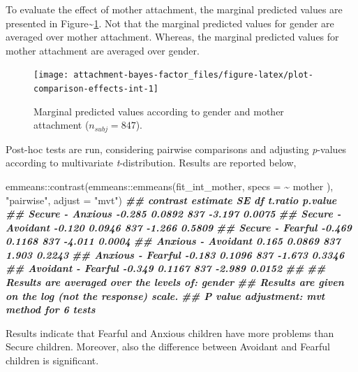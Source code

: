 \documentclass[
]{book}
\newenvironment{Shaded}{\begin{snugshade}}{\end{snugshade}}
\newcommand{\AttributeTok}[1]{\textcolor[rgb]{0.77,0.63,0.00}{#1}}
\newcommand{\DocumentationTok}[1]{\textcolor[rgb]{0.56,0.35,0.01}{\textbf{\textit{#1}}}}
\newcommand{\FunctionTok}[1]{\textcolor[rgb]{0.00,0.00,0.00}{#1}}
\newcommand{\NormalTok}[1]{#1}
\newcommand{\SpecialCharTok}[1]{\textcolor[rgb]{0.00,0.00,0.00}{#1}}
\newcommand{\StringTok}[1]{\textcolor[rgb]{0.31,0.60,0.02}{#1}}
\begin{document}
To evaluate the effect of mother attachment, the marginal predicted values are presented in Figure\textasciitilde\ref{fig:plot-comparison-effects-int}. Not that the marginal predicted values for gender are averaged over mother attachment. Whereas, the marginal predicted values for mother attachment are averaged over gender.

\begin{figure}

{\centering \texttt{[image: attachment-bayes-factor\_files/figure-latex/plot-comparison-effects-int-1]} 

}

\caption{Marginal predicted values according to gender and mother attachment ($n_{subj} = 847$).}\label{fig:plot-comparison-effects-int}
\end{figure}

Post-hoc tests are run, considering pairwise comparisons and adjusting \emph{p}-values according to multivariate \emph{t}-distribution. Results are reported below,

\begin{Shaded}
\begin{Highlighting}[]
\NormalTok{emmeans}\SpecialCharTok{::}\FunctionTok{contrast}\NormalTok{(emmeans}\SpecialCharTok{::}\FunctionTok{emmeans}\NormalTok{(fit\_int\_mother, }\AttributeTok{specs =} \SpecialCharTok{\textasciitilde{}}\NormalTok{ mother ),}
                  \StringTok{"pairwise"}\NormalTok{, }\AttributeTok{adjust =} \StringTok{"mvt"}\NormalTok{)}
\DocumentationTok{\#\#  contrast           estimate     SE  df t.ratio p.value}
\DocumentationTok{\#\#  Secure {-} Anxious     {-}0.285 0.0892 837  {-}3.197  0.0075}
\DocumentationTok{\#\#  Secure {-} Avoidant    {-}0.120 0.0946 837  {-}1.266  0.5809}
\DocumentationTok{\#\#  Secure {-} Fearful     {-}0.469 0.1168 837  {-}4.011  0.0004}
\DocumentationTok{\#\#  Anxious {-} Avoidant    0.165 0.0869 837   1.903  0.2243}
\DocumentationTok{\#\#  Anxious {-} Fearful    {-}0.183 0.1096 837  {-}1.673  0.3346}
\DocumentationTok{\#\#  Avoidant {-} Fearful   {-}0.349 0.1167 837  {-}2.989  0.0152}
\DocumentationTok{\#\# }
\DocumentationTok{\#\# Results are averaged over the levels of: gender }
\DocumentationTok{\#\# Results are given on the log (not the response) scale. }
\DocumentationTok{\#\# P value adjustment: mvt method for 6 tests}
\end{Highlighting}
\end{Shaded}

Results indicate that Fearful and Anxious children have more problems than Secure children. Moreover, also the difference between Avoidant and Fearful children is significant.
\end{document}
